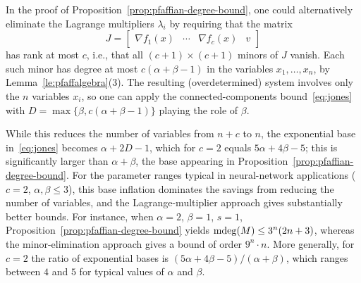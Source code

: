   \begin{remark}\label{rem:lagrange-vs-minors}
    In the proof of Proposition~\ref{prop:pfaffian-degree-bound}, one could alternatively eliminate the Lagrange multipliers $\lambda_i$ by requiring that the matrix
  \begin{equation}\label{eq:jacobian}
    J =
    \begin{bmatrix}
      \nabla f_1(x) & \cdots & \nabla f_c(x) & v
    \end{bmatrix}
  \end{equation}
  has rank at most $c$, i.e., that all $(c{+}1)\times(c{+}1)$ minors of $J$ vanish. Each such minor has degree at most $c(\alpha+\beta-1)$ in the variables $x_1,\dots,x_n$, by Lemma~\ref{le:pfaffalgebra}(3). The resulting (overdetermined) system involves only the $n$ variables $x_i$, so one can apply the connected-components bound~\eqref{eq:jones} with $D = \max\{\beta, c(\alpha+\beta-1)\}$ playing the role of $\beta$.

  While this reduces the number of variables from $n+c$ to $n$, the exponential base in~\eqref{eq:jones} becomes $\alpha + 2D - 1$, which for $c = 2$ equals $5\alpha + 4\beta - 5$; this is significantly larger than $\alpha + \beta$, the base appearing in Proposition~\ref{prop:pfaffian-degree-bound}.
  For the parameter ranges typical in neural-network applications ($c = 2$, $\alpha, \beta \le 3$), this base inflation dominates the savings from reducing the number of variables, and the Lagrange-multiplier approach gives substantially better bounds. For instance, when $\alpha = 2$, $\beta = 1$, $s = 1$, Proposition~\ref{prop:pfaffian-degree-bound} yields $\operatorname{\mathrm{mdeg}}(M) \le 3^n(2n+3)$, whereas the minor-elimination approach gives a bound of order $9^n \cdot n$. More generally, for $c = 2$ the ratio of exponential bases is $(5\alpha + 4\beta - 5)/(\alpha + \beta)$, which ranges between $4$ and $5$ for typical values of $\alpha$ and $\beta$.
\end{remark}


